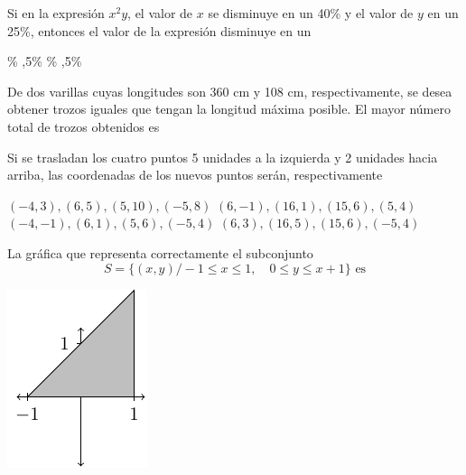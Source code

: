 \documentclass[10pt,letterpaper,addpoints]{exam}
\begin{document}
\begin{multicols}{2}
\begin{questions}
\question
Si en la expresión $ x^2y $, el valor de $ x $ se disminuye en un 40\% y el valor de $ y $ en un 25\%, entonces el valor de la expresión disminuye en un

\begin{oneparchoices}
\% ,5\% \% ,5\%
\end{oneparchoices}
\question
De dos varillas cuyas longitudes son 360 cm y 108 cm, respectivamente, se desea obtener trozos iguales que tengan la longitud máxima posible. El mayor número total de trozos obtenidos es

\begin{oneparchoices}
        
\end{oneparchoices}
\question Si se trasladan los cuatro puntos 5 unidades a la izquierda y 2 unidades hacia arriba, las coordenadas de los nuevos puntos serán, respectivamente
\begin{choices}
  \CorrectChoice $(-4,3), (6,5), (5,10), (-5,8)$
  \choice $(6,-1), (16,1), (15,6), (5,4)$
  \choice $(-4,-1), (6,1), (5,6), (-5,4)$
  \choice $(6,3), (16,5), (15,6), (-5,4)$
\end{choices}
  \question La gráfica que representa correctamente el subconjunto \[ S=\{(x,y)/ -1\leq x\leq 1, \quad 0\leq y \leq x+1\} \text{ es} \]
\begin{choices}
\begin{multicols}{2}
\CorrectChoice \includegraphics[scale=.75]{Images/desigA.pdf} 

\end{multicols}
\end{choices}
\end{questions}
\end{multicols}
\end{document}
